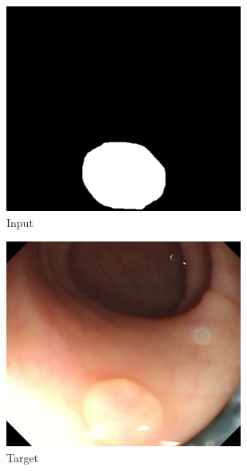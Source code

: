 \begin{figure}
	\centering
	\begin{subfigure}{.19\textwidth}
		\centering
		\includegraphics[width=.9\linewidth]{img/results/btoa_input}
		\caption{Input}
	\end{subfigure}
	\begin{subfigure}{.19\textwidth}
		\centering
		\includegraphics[width=.9\linewidth]{img/results/btoa_target}
		\caption{Target}
	\end{subfigure}
	\begin{subfigure}{.19\textwidth}
		\centering

\end{subfigure}
\end{figure}
